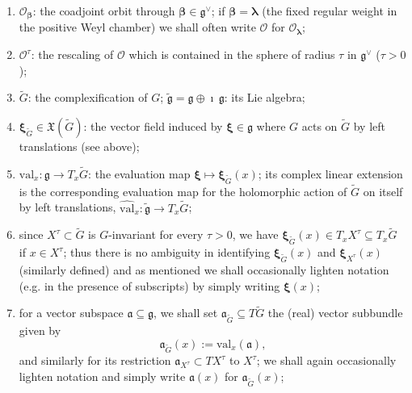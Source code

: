\documentclass[12pt,a4paper]{article}
\theoremstyle{plain}
\theoremstyle{definition}
\begin{document}
\begin{enumerate}

\item $\mathcal{O}_{\boldsymbol{\beta}}$: the coadjoint orbit through 
$\boldsymbol{\beta}\in \mathfrak{g}^\vee$; if $\boldsymbol{\beta}=
\boldsymbol{\lambda}$ (the fixed regular weight in the positive Weyl chamber) we shall often write $\mathcal{O}$ for $\mathcal{O}_{\boldsymbol{\lambda}}$;

\item $\mathcal{O}^\tau$: the rescaling of $\mathcal{O}$ which is contained in the sphere of radius $\tau$ in $\mathfrak{g}^\vee$ ($\tau>0$);

\item $\tilde{G}$: the complexification of $G$; $\tilde{\mathfrak{g}}=
\mathfrak{g}\oplus\imath\,\mathfrak{g}$: its Lie algebra;


\item $\boldsymbol{\xi}_{\tilde{G}}\in \mathfrak{X}(\tilde{G})$:
the vector field induced by $\boldsymbol{\xi}\in \mathfrak{g}$
where $G$ acts on $\tilde{G}$ by left translations (see above);


\item $\mathrm{val}_x:\mathfrak{g}\rightarrow T_x\tilde{G}$:
the evaluation map $\boldsymbol{\xi}\mapsto \boldsymbol{\xi}_{\tilde{G}}(x)$; its complex linear extension is the 
corresponding evaluation map for the holomorphic action
of $\tilde{G}$ on itself by left translations,
$\widehat{\mathrm{val}}_{x}:\tilde{\mathfrak{g}}\rightarrow T_x\tilde{G}$;

\item since $X^\tau\subset\tilde{G}$ is $G$-invariant for every $\tau>0$,
we have 
$\boldsymbol{\xi}_{\tilde{G}}(x)\in T_xX^\tau\subseteq T_x\tilde{G}$ 
if $x\in X^\tau$;
thus there is no ambiguity in identifying $\boldsymbol{\xi}_{\tilde{G}}(x)$ and
$\boldsymbol{\xi}_{X^\tau}(x)$ (similarly defined) and 
as mentioned we shall occasionally lighten notation (e.g. in the presence of subscripts) by simply writing 
$\boldsymbol{\xi}(x)$;

\item for a vector subspace $\mathfrak{a}\subseteq \mathfrak{g}$,
we shall set $\mathfrak{a}_{\tilde{G}}\subseteq T\tilde{G}$
the (real) vector subbundle given by
$$
\mathfrak{a}_{\tilde{G}}(x):=
\mathrm{val}_x(\mathfrak{a}),
$$
and similarly for its restriction 
$\mathfrak{a}_{X^\tau}\subset TX^\tau$ to $X^\tau$; we shall again 
occasionally lighten notation and simply write $\mathfrak{a}(x)$
for $\mathfrak{a}_{\tilde{G}}(x)$;


\end{enumerate}
\end{document}
